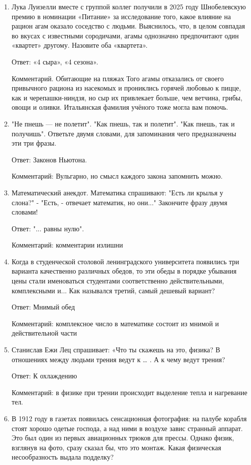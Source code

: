 \documentclass[oneside,final,14pt]{extreport}
\begin{document}
\begin{enumerate}
    \item Лука Луизелли вместе с группой коллег получили в 2025 году Шнобелевскую премию в номинации «Питание» за исследование того, какое влияние на рацион агам оказало соседство с людьми. Выяснилось, что, в целом совпадая во вкусах с известными сородичами, агамы однозначно предпочитают один «квартет» другому. Назовите оба «квартета».

    Ответ: «4 сыра», «4 сезона».

    Комментарий. Обитающие на пляжах Того агамы отказались от своего привычного рациона из насекомых и прониклись горячей любовью к пицце, как и черепашки-ниндзя, но сыр их привлекает больше, чем ветчина, грибы, овощи и оливки. Итальянская фамилия учёного тоже могла вам помочь.

    \item "Не пнешь — не полетит". "Как пнешь, так и полетит". "Как пнешь, так и получишь". Ответьте двумя словами, для запоминания чего предназначены эти три фразы.

    Ответ: Законов Ньютона.

    Комментарий: Вульгарно, но смысл каждого закона запомнить можно.

    \item Математический анекдот. Математика спрашивают: "Есть ли крылья у слона?" - "Есть, - отвечает математик, но они..." Закончите фразу двумя словами!

    Ответ: "... равны нулю".

    Комментарий: комментарии излишни

    \item Когда в студенческой столовой ленинградского университета появились три варианта качественно различных обедов, то эти обеды в порядке убывания цены стали именоваться студентами соответственно действительными, комплексными и... Как назывался третий, самый дешевый вариант?

    Ответ: Мнимый обед

    Комментарий: комплексное число в математике состоит из мнимой и действительной части

    \item Станислав Ежи Лец спрашивает: «Что ты скажешь на это, физика? В отношениях между людьми трения ведут к … . А к чему ведут трения?

    Ответ: К охлаждению

    Комментарий: в физике при трении происходит выделение тепла и нагревание тел.

    \item В 1912 году в газетах появилась сенсационная фотография: на палубе корабля стоят хорошо одетые господа, а над ними в воздухе завис странный аппарат. Это был один из первых авиационных трюков для прессы. Однако физик, взглянув на фото, сразу сказал бы, что это монтаж. Какая физическая несообразность выдала подделку?


\end{enumerate}
\end{document}
